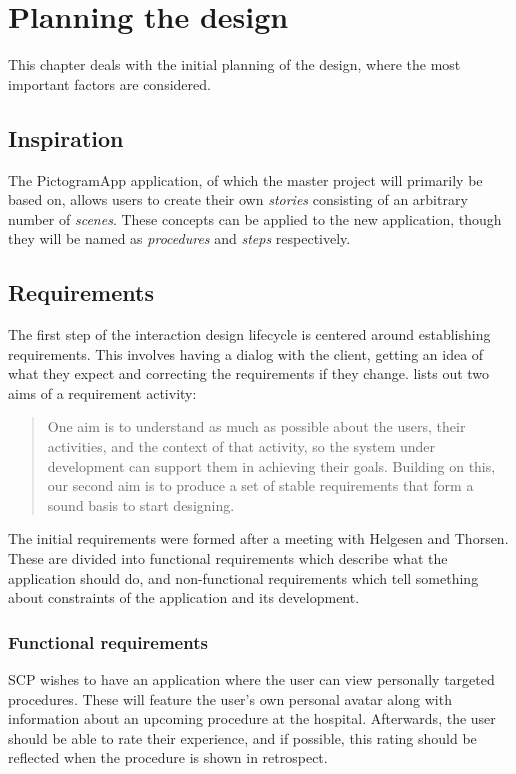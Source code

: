 \chapter{Planning the design}
\label{ch:planning}

This chapter deals with the initial planning of the design, where the most important factors are considered.

\section{Inspiration}

The PictogramApp application, of which the master project will primarily be based on, allows users to create their own \emph{stories} consisting of an arbitrary number of \emph{scenes}. These concepts can be applied to the new application, though they will be named as \emph{procedures} and \emph{steps} respectively.

\section{Requirements}
\label{sec:requirements}

The first step of the interaction design lifecycle is centered around establishing requirements. This involves having a dialog with the client, getting an idea of what they expect and correcting the requirements if they change. \textcite{preece2015} lists out two aims of a requirement activity:

\begin{quote}
    One aim is to understand as much as possible about the users, their activities, and the context of that activity, so the system under development can support them in achieving their goals. Building on this, our second aim is to produce a set of stable requirements that form a sound basis to start designing.
\end{quote}

The initial requirements were formed after a meeting with Helgesen and Thorsen. These are divided into functional requirements which describe what the application should do, and non-functional requirements which tell something about constraints of the application and its development.

\subsection{Functional requirements}

SCP wishes to have an application where the user can view personally targeted procedures. These will feature the user's own personal avatar along with information about an upcoming procedure at the hospital. Afterwards, the user should be able to rate their experience, and if possible, this rating should be reflected when the procedure is shown in retrospect.



